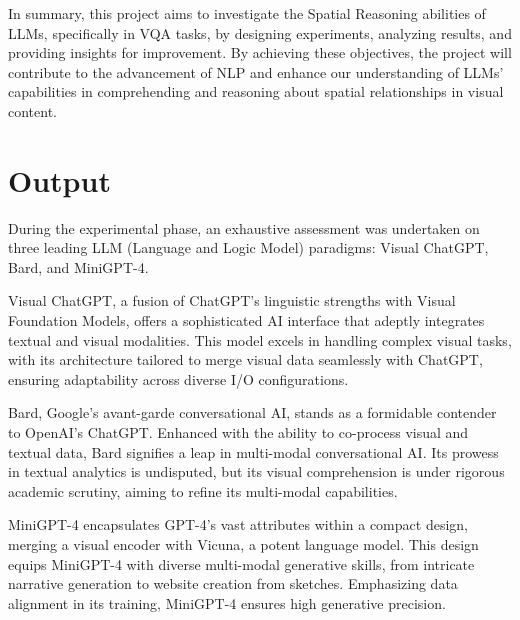 \documentclass[journal,10pt]{IEEEtran}
\begin{document}
In summary, this project aims to investigate the Spatial Reasoning abilities of LLMs, specifically in VQA tasks, by designing experiments, analyzing results, and providing insights for improvement. By achieving these objectives, the project will contribute to the advancement of NLP and enhance our understanding of LLMs' capabilities in comprehending and reasoning about spatial relationships in visual content.

\section{Output}
During the experimental phase, an exhaustive assessment was undertaken on three leading LLM (Language and Logic Model) paradigms: Visual ChatGPT\cite{wu2023visual}, Bard, and MiniGPT-4\cite{zhu2023minigpt4}.

Visual ChatGPT, a fusion of ChatGPT's linguistic strengths with Visual Foundation Models, offers a sophisticated AI interface that adeptly integrates textual and visual modalities. This model excels in handling complex visual tasks, with its architecture tailored to merge visual data seamlessly with ChatGPT, ensuring adaptability across diverse I/O configurations\cite{wu2023visual}.

Bard, Google's avant-garde conversational AI, stands as a formidable contender to OpenAI's ChatGPT. Enhanced with the ability to co-process visual and textual data, Bard signifies a leap in multi-modal conversational AI. Its prowess in textual analytics is undisputed, but its visual comprehension is under rigorous academic scrutiny, aiming to refine its multi-modal capabilities\cite{qin2023good}.

MiniGPT-4 encapsulates GPT-4's vast attributes within a compact design, merging a visual encoder with Vicuna, a potent language model. This design equips MiniGPT-4 with diverse multi-modal generative skills, from intricate narrative generation to website creation from sketches. Emphasizing data alignment in its training, MiniGPT-4 ensures high generative precision\cite{zhu2023minigpt4}.
\end{document}

